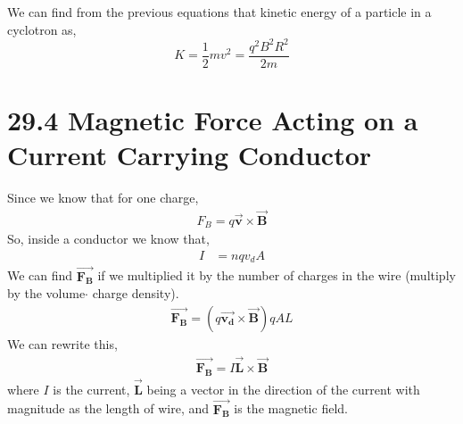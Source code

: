 \documentclass[12pt, titlepage, oneside]{article}
\let\oldvec\vec
\renewcommand{\vec}[1]{\oldvec{\bm{#1}}}
\begin{document}
We can find from the previous equations that kinetic energy of a particle in a cyclotron as,
\begin{equation*}
K = \frac{1}{2}mv^2 = \frac{q^2B^2R^2}{2m}
\end{equation*}
\section*{29.4 Magnetic Force Acting on a Current Carrying Conductor}
Since we know that for one charge,
\begin{align*}
F_B  = q\vec{v} \times \vec{B}
\end{align*}
So, inside a conductor we know that,
\begin{align*}
I &= nqv_d A
\end{align*}
We can find $\vec{F_B}$ if we multiplied it by the number of charges in the wire (multiply by the volume$\cdot$ charge density).
\begin{align*}
\vec{F_B} = (q \vec{v_d} \times \vec{B})qAL
\end{align*}
We can rewrite this,
\begin{align*}
\vec{F_B} = I \vec{L} \times \vec{B}
\end{align*}
where $I$ is the current, $\vec{L}$ being a vector in the direction of the current with magnitude as the length of wire, and $\vec{F_B}$ is the magnetic field.
\end{document}
